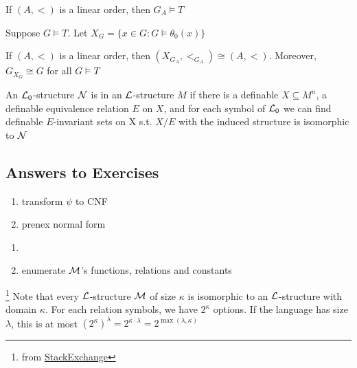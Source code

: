 \documentclass[11pt]{article}
\begin{document}
If \((A,<)\) is a linear order, then \(G_A\models T\)

Suppose \(G\models T\). Let \(X_G=\{x\in G:G\models\theta_0(x)\}\)

\begin{lemma}[]
If \((A,<)\) is a linear order, then \((X_{G_A},<_{G_A})\cong(A,<)\). Moreover,
\(G_{X_G}\cong G\) for all \(G\models T\)
\end{lemma}

\begin{definition}[]
An \(\mathcal{L}_0\)-structure \(\mathcal{N}\) is  in an
\(\mathcal{L}\)-structure \(M\) if there is a definable \(X\subseteq M^n\), a definable
equivalence relation \(E\) on \(X\), and for each symbol of \(\mathcal{L}_0\) we can find
definable \(E\)-invariant sets on X s.t. \(X/E\) with the induced structure is
isomorphic to \(\mathcal{N}\)
\end{definition}
\subsection{Answers to Exercises}
\label{sec:orgdcb8917}
\begin{exercise}
\begin{enumerate}
\item transform $\psi$ to CNF
\item prenex normal form
\end{enumerate}
\end{exercise}

\begin{exercise}
\begin{enumerate}
\item 
{}
\item enumerate $\mathcal{M}$'s functions, relations and constants
\end{enumerate}
\end{exercise}

\begin{exercise}
\footnote{from \href{https://math.stackexchange.com/questions/1170953/let-alpha-be-any-cardinal-there-are-at-most-2-alpha-cup-mathscrl}{StackExchange}}
Note that every \(\mathcal{L}\)-structure $\mathcal{M}$ of size $\kappa$ is isomorphic to an
\(\mathcal{L}\)-structure with domain $\kappa$. For each relation symbols, we have $2^\kappa$
options. If the language has size $\lambda$, this is at most 
$(2^\kappa)^\lambda=2^{\kappa\cdot\lambda}=2^{\max(\lambda,\kappa)}$
\end{exercise}
\end{document}
